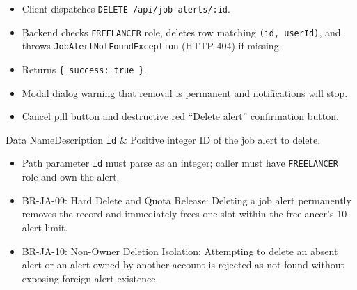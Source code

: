 \begin{itemize}[leftmargin=1.6em,topsep=3pt,itemsep=2pt,parsep=0pt,label=$\bullet$]
    \item Client dispatches \texttt{DELETE /api/job-alerts/:id}.
    \item Backend checks \texttt{FREELANCER} role, deletes row matching \texttt{(id, userId)}, and throws \texttt{JobAlertNotFoundException} (HTTP 404) if missing.
    \item Returns \texttt{\{ success: true \}}.
\end{itemize}

\begin{itemize}[leftmargin=1.6em,topsep=3pt,itemsep=2pt,parsep=0pt,label=$\bullet$]
    \item Modal dialog warning that removal is permanent and notifications will stop.
    \item Cancel pill button and destructive red ``Delete alert'' confirmation button.
\end{itemize}


\begin{specdatatable}{Data Name}{Description}
\texttt{id} & Positive integer ID of the job alert to delete.\\ \hline
\end{specdatatable}

\begin{itemize}[leftmargin=1.6em,topsep=3pt,itemsep=2pt,parsep=0pt,label=$\bullet$]
    \item Path parameter \texttt{id} must parse as an integer; caller must have \texttt{FREELANCER} role and own the alert.
\end{itemize}

\begin{itemize}[leftmargin=1.6em,topsep=3pt,itemsep=2pt,parsep=0pt,label=$\bullet$]\brrulelist
    \item BR-JA-09: Hard Delete and Quota Release: Deleting a job alert permanently removes the record and immediately frees one slot within the freelancer's 10-alert limit.
    \item BR-JA-10: Non-Owner Deletion Isolation: Attempting to delete an absent alert or an alert owned by another account is rejected as not found without exposing foreign alert existence.
\end{itemize}

